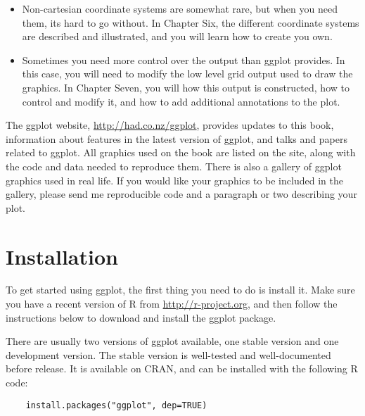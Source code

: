 \begin{itemize}
	\item Non-cartesian coordinate systems are somewhat rare, but when you need them, its hard to go without.  In Chapter Six, the different coordinate systems are described and illustrated, and you will learn how to create you own.
	
	
	\item Sometimes you need more control over the output than ggplot provides.  In this case, you will need to modify the low level grid output used to draw the graphics.  In Chapter Seven, you will how this output is constructed, how to control and modify it, and how to add additional annotations to the plot.

\end{itemize}

The ggplot website, \url{http://had.co.nz/ggplot}, provides updates to this book, information about features in the latest version of ggplot, and talks and papers related to ggplot.  All graphics used on the book are listed on the site, along with the code and data needed to reproduce them.  There is also a gallery of ggplot graphics used in real life.  If you would like your graphics to be included in the gallery, please send me reproducible code and a paragraph or two describing your plot.

\section{Installation}\label{sub:installation}

To get started using ggplot, the first thing you need to do is install it.  Make sure you have a recent version of R from \url{http://r-project.org}, and then follow the instructions below to download and install the ggplot package.  

There are usually two versions of ggplot available, one stable version and one development version. The stable version is well-tested and well-documented before release.  It is available on CRAN, and can be installed with the following R code:

\begin{verbatim}
	install.packages("ggplot", dep=TRUE)
\end{verbatim}

